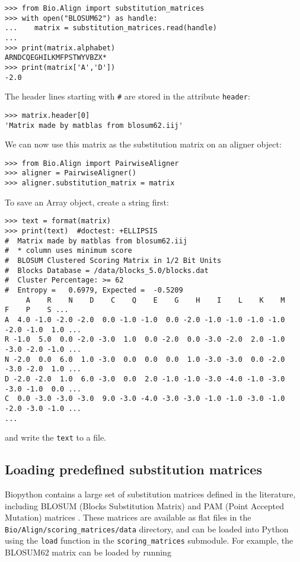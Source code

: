 \begin{verbatim}
>>> from Bio.Align import substitution_matrices
>>> with open("BLOSUM62") as handle:
...    matrix = substitution_matrices.read(handle)
...
>>> print(matrix.alphabet)
ARNDCQEGHILKMFPSTWYVBZX*
>>> print(matrix['A','D'])
-2.0
\end{verbatim}
The header lines starting with \verb+#+ are stored in the attribute \verb+header+:

\begin{verbatim}
>>> matrix.header[0]
'Matrix made by matblas from blosum62.iij'
\end{verbatim}
We can now use this matrix as the substitution matrix on an aligner object:

\begin{verbatim}
>>> from Bio.Align import PairwiseAligner
>>> aligner = PairwiseAligner()
>>> aligner.substitution_matrix = matrix
\end{verbatim}
To save an Array object, create a string first:

\begin{verbatim}
>>> text = format(matrix)
>>> print(text)  #doctest: +ELLIPSIS
#  Matrix made by matblas from blosum62.iij
#  * column uses minimum score
#  BLOSUM Clustered Scoring Matrix in 1/2 Bit Units
#  Blocks Database = /data/blocks_5.0/blocks.dat
#  Cluster Percentage: >= 62
#  Entropy =   0.6979, Expected =  -0.5209
     A    R    N    D    C    Q    E    G    H    I    L    K    M    F    P    S ...
A  4.0 -1.0 -2.0 -2.0  0.0 -1.0 -1.0  0.0 -2.0 -1.0 -1.0 -1.0 -1.0 -2.0 -1.0  1.0 ...
R -1.0  5.0  0.0 -2.0 -3.0  1.0  0.0 -2.0  0.0 -3.0 -2.0  2.0 -1.0 -3.0 -2.0 -1.0 ...
N -2.0  0.0  6.0  1.0 -3.0  0.0  0.0  0.0  1.0 -3.0 -3.0  0.0 -2.0 -3.0 -2.0  1.0 ...
D -2.0 -2.0  1.0  6.0 -3.0  0.0  2.0 -1.0 -1.0 -3.0 -4.0 -1.0 -3.0 -3.0 -1.0  0.0 ...
C  0.0 -3.0 -3.0 -3.0  9.0 -3.0 -4.0 -3.0 -3.0 -1.0 -1.0 -3.0 -1.0 -2.0 -3.0 -1.0 ...
...
\end{verbatim}
and write the \verb+text+ to a file.

\subsection*{Loading predefined substitution matrices}

Biopython contains a large set of substitution matrices defined in the literature, including BLOSUM (Blocks Substitution Matrix) \cite{henikoff1992} and PAM (Point Accepted Mutation) matrices \cite{dayhoff1978}. These matrices are available as flat files in the \verb+Bio/Align/scoring_matrices/data+ directory, and can be loaded into Python using the \verb+load+ function in the \verb+scoring_matrices+ submodule. For example, the BLOSUM62 matrix can be loaded by running

